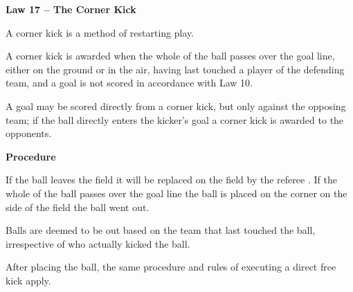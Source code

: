 \clearpage
\sffamily
{\bfseries\color[rgb]{0.4,0.4,0.4}
Law 17 -- The Corner Kick}
{}


\bigskip

A corner kick is a method of restarting play.

\bigskip

A corner kick is awarded when the whole of the ball passes over the goal line, either on the ground or in the air, having last touched a player of the defending team, and a goal is not scored in accordance with Law 10.

\bigskip

A goal may be scored directly from a corner kick, but only against the opposing team;
if the ball directly enters the kicker's goal a corner kick is awarded to the opponents.

\bigskip

{\bfseries Procedure}

\headlinebox

If the ball leaves the field it will be replaced on the field by the referee%
.
If the whole of the ball passes over the goal line the ball is placed on the
corner on the side of the field the ball went out.

\bigskip

Balls are deemed to be out based on the team that last touched the ball,
irrespective of who actually kicked the ball. 

\bigskip

After placing the ball, the same procedure and rules of executing a direct free kick apply.

\bigskip


